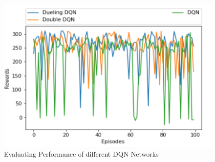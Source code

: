 \begin{figure}[!ht]
\centering
\includegraphics[scale=0.75,width=0.75\columnwidth]{figures/Picture2.png}%
\caption{ Evaluating Performance of different DQN Networks}%
\label{fig:Visualization}%
\end{figure}


